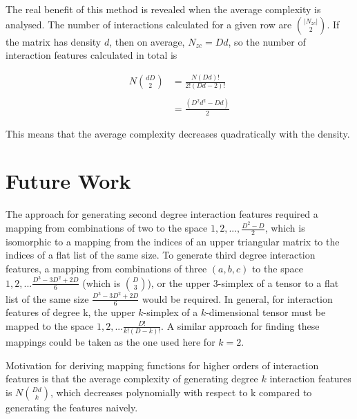 \documentclass[11pt]{article}
\begin{document}
The real benefit of this method is revealed when the average complexity is analysed. The 
number of interactions calculated for a given row are $\binom{|N_{zc}|}{2}$. If the matrix has 
density $d$, then on average, $N_{zc} = D d$, so the number of interaction features 
calculated in total is 

\begin{align*}
N \binom{d D}{2} &= \frac{N (Dd)!}{2!(Dd-2)!}\\
    \\
    &= \frac{(D^2d^2-Dd)}{2}
\end{align*}

This means that the average complexity decreases quadratically with the density.

\section{Future Work}
The approach for generating second degree interaction features required a mapping from 
combinations of two to the space $1,2,...,\frac{D^2-D}{2}$, which is isomorphic to a mapping from 
the indices of an upper triangular matrix to the indices of a flat list of the same size. 
To generate third degree interaction features, a mapping from combinations of three 
$(a,b,c)$ to the space $1,2,...\frac{D^3-3D^2+2D}{6}$ (which is $\binom{D}{3}$), or the upper $3$-simplex of a tensor to a flat 
list of the same size $\frac{D^3-3D^2+2D}{6}$ would be required. In general, for interaction 
features of degree k, the upper $k$-simplex of a $k$-dimensional tensor must be mapped to the 
space $1,2,...\frac{D!}{k!(D-k)!}$. A similar approach for finding these mappings could be taken 
as the one used here for $k=2$. 

Motivation for deriving mapping functions for higher orders
of interaction features is that the average complexity of generating degree $k$ interaction
features is $N \binom{Dd}{k}$, which decreases polynomially with respect to k compared to
generating the features naively.

    
\vskip 0.2in

\end{document}
